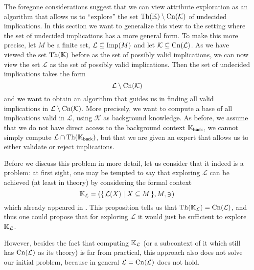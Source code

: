 The foregone considerations suggest that we can view attribute exploration as an algorithm
that allows us to ``explore'' the set $\operatorname{Th}({\mathbb{K}}) \setminus \operatorname{Cn}(\mathcal{K})$ of
undecided implications.  In this section we want to generalize this view to the setting
where the set of undecided implications has a more general form.  To make this more
precise, let $M$ be a finite set, $\mathcal{L} \subseteq \operatorname{Imp}(M)$ and let $\mathcal{K}
\subseteq \operatorname{Cn}(\mathcal{L})$.  As we have viewed the set $\operatorname{Th}({\mathbb{K}})$ before as the set of
possibly valid implications, we can now view the set $\mathcal{L}$ as the set of possibly
valid implications.  Then the set of undecided implications takes the form
\begin{equation*}
  \mathcal{L} \setminus \operatorname{Cn}(\mathcal{K})
\end{equation*}
and we want to obtain an algorithm that guides us in finding all valid implications in
$\mathcal{L} \setminus \operatorname{Cn}(\mathcal{K})$.  More precisely, we want to compute a base of
all implications valid in $\mathcal{L}$, using $\mathcal{K}$ as background knowledge.  As
before, we assume that we do not have direct access to the background context ${\mathbb{K}}_{\mathsf{back}}$, \ie we cannot simply compute $\mathcal{L} \cap \operatorname{Th}({\mathbb{K}}_{\mathsf{back}})$, but that we are given an expert that allows us to either validate or
reject implications.

Before we discuss this problem in more detail, let us consider that it indeed is a
problem: at first sight, one may be tempted to say that exploring $\mathcal{L}$ can be
achieved (at least in theory) by considering the formal context
\begin{equation*}
  {\ensuremath{\mathbb{K}}}_{\mathcal{L}} = ({\{\, \mathcal{L}(X) \mid X \subseteq M \,\}}, M, \ni)
\end{equation*}
which already appeared in .  This proposition
tells us that $\operatorname{Th}({\mathbb{K}}_{\mathcal{L}}) = \operatorname{Cn}(\mathcal{L})$, and thus one could propose
that for exploring $\mathcal{L}$ it would just be sufficient to explore ${\mathbb{K}}_{\mathcal{L}}$.

However, besides the fact that computing ${\mathbb{K}}_{\mathcal{L}}$ (or a subcontext of it
which still has $\operatorname{Cn}(\mathcal{L})$ as its theory) is far from practical, this approach
also does not solve our initial problem, because in general $\mathcal{L} =
\operatorname{Cn}(\mathcal{L})$ does not hold.

